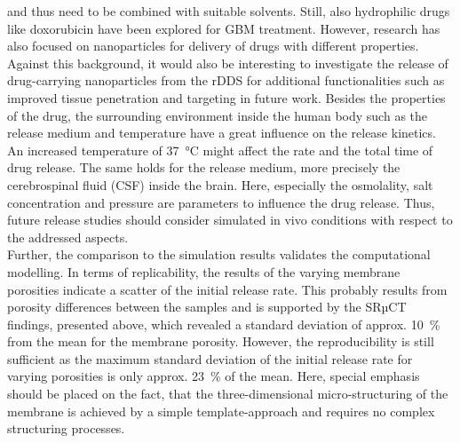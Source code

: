 and thus need to be combined with suitable solvents. Still, also hydrophilic drugs like doxorubicin have been explored for GBM treatment\supercite{malfanti2022design}. However, research has also focused on nanoparticles for delivery of drugs with different properties\supercite{mitchell2021engineering}. Against this background, it would also be interesting to investigate the release of drug-carrying nanoparticles from the rDDS for additional functionalities such as improved tissue penetration and targeting\supercite{gazaille2021local,nance2014brain} in future work. Besides the properties of the drug, the surrounding environment inside the human body such as the release medium and temperature have a great influence on the release kinetics. An increased temperature of 37~°C might affect the rate and the total time of drug release. The same holds for the release medium, more precisely the cerebrospinal fluid (CSF) inside the brain. Here, especially the osmolality, salt concentration and pressure are parameters to influence the drug release. Thus, future release studies should consider simulated in vivo conditions with respect to the addressed aspects.  \\        
Further, the comparison to the simulation results validates the computational modelling. In terms of replicability, the results of the varying membrane porosities indicate a scatter of the initial release rate. This probably results from porosity differences between the samples and is supported by the SRµCT findings, presented above, which revealed a standard deviation of approx. 10~\% from the mean for the membrane porosity. However, the reproducibility is still sufficient as the maximum standard deviation of the initial release rate for varying porosities is only approx. 23~\% of the mean. Here, special emphasis should be placed on the fact, that the three-dimensional micro-structuring of the membrane is achieved by a simple template-approach and requires no complex structuring processes.


